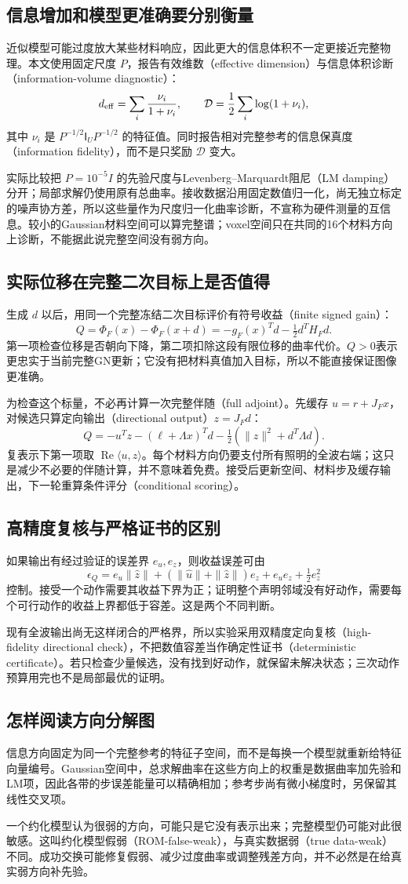 \subsection{信息增加和模型更准确要分别衡量}
近似模型可能过度放大某些材料响应，因此更大的信息体积不一定更接近完整物理。本文使用固定尺度 $P$，报告有效维数（effective dimension）与信息体积诊断（information-volume diagnostic）：
\[
 d_{\rm eff}=\sum_i\frac{\nu_i}{1+\nu_i},\qquad
 \mathcal D=\frac12\sum_i\log(1+\nu_i),
\]
其中 $\nu_i$ 是 $P^{-1/2}\mathsf I_UP^{-1/2}$ 的特征值。同时报告相对完整参考的信息保真度（information fidelity），而不是只奖励 $\mathcal D$ 变大。

实际比较把 $P=10^{-5}I$ 的先验尺度与Levenberg--Marquardt阻尼（LM damping）分开；局部求解仍使用原有总曲率。接收数据沿用固定数值归一化，尚无独立标定的噪声协方差，所以这些量作为尺度归一化曲率诊断，不宣称为硬件测量的互信息。较小的Gaussian材料空间可以算完整谱；voxel空间只在共同的16个材料方向上诊断，不能据此说完整空间没有弱方向。

\subsection{实际位移在完整二次目标上是否值得}
生成 $d$ 以后，用同一个完整冻结二次目标评价有符号收益（finite signed gain）：
\[
 Q=\Phi_F(x)-\Phi_F(x+d)=-g_F(x)^Td-\tfrac12d^TH_Fd.
\]
第一项检查位移是否朝向下降，第二项扣除这段有限位移的曲率代价。$Q>0$表示更忠实于当前完整GN更新；它没有把材料真值加入目标，所以不能直接保证图像更准确。

为检查这个标量，不必再计算一次完整伴随（full adjoint）。先缓存 $u=r+J_Fx$，对候选只算定向输出（directional output）$z=J_Fd$：
\[
 Q=-u^Tz-(\ell+\Lambda x)^Td
     -\tfrac12(\|z\|^2+d^T\Lambda d).
\]
复表示下第一项取 $\operatorname{Re}\langle u,z\rangle$。每个材料方向仍要支付所有照明的全波右端；这只是减少不必要的伴随计算，并不意味着免费。接受后更新空间、材料步及缓存输出，下一轮重算条件评分（conditional scoring）。

\subsection{高精度复核与严格证书的区别}
如果输出有经过验证的误差界 $e_u,e_z$，则收益误差可由
\[
 \epsilon_Q=e_u\|\widehat z\|+(\|\widehat u\|+\|\widehat z\|)e_z+e_ue_z+\tfrac12e_z^2
\]
控制。接受一个动作需要其收益下界为正；证明整个声明邻域没有好动作，需要每个可行动作的收益上界都低于容差。这是两个不同判断。

现有全波输出尚无这样闭合的严格界，所以实验采用双精度定向复核（high-fidelity directional check），不把数值容差当作确定性证书（deterministic certificate）。若只检查少量候选，没有找到好动作，就保留未解决状态；三次动作预算用完也不是局部最优的证明。

\subsection{怎样阅读方向分解图}
信息方向固定为同一个完整参考的特征子空间，而不是每换一个模型就重新给特征向量编号。Gaussian空间中，总求解曲率在这些方向上的权重是数据曲率加先验和LM项，因此各带的步误差能量可以精确相加；参考步尚有微小梯度时，另保留其线性交叉项。

一个约化模型认为很弱的方向，可能只是它没有表示出来；完整模型仍可能对此很敏感。这叫约化模型假弱（ROM-false-weak），与真实数据弱（true data-weak）不同。成功交换可能修复假弱、减少过度曲率或调整残差方向，并不必然是在给真实弱方向补先验。
